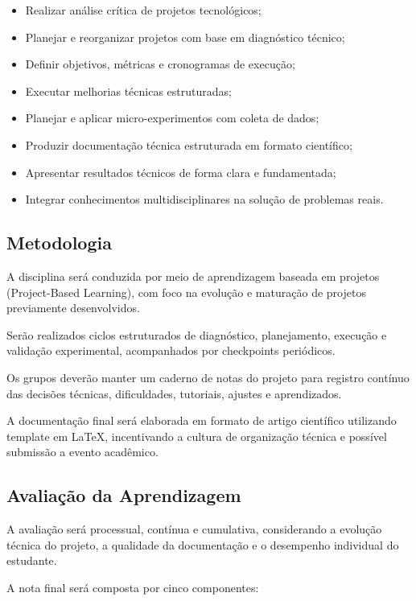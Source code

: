 \begin{itemize}
    \item Realizar análise crítica de projetos tecnológicos;
    \item Planejar e reorganizar projetos com base em diagnóstico técnico;
    \item Definir objetivos, métricas e cronogramas de execução;
    \item Executar melhorias técnicas estruturadas;
    \item Planejar e aplicar micro-experimentos com coleta de dados;
    \item Produzir documentação técnica estruturada em formato científico;
    \item Apresentar resultados técnicos de forma clara e fundamentada;
    \item Integrar conhecimentos multidisciplinares na solução de problemas reais.
\end{itemize}

\subsection*{Metodologia}

A disciplina será conduzida por meio de aprendizagem baseada em projetos (Project-Based Learning), com foco na evolução e maturação de projetos previamente desenvolvidos.

Serão realizados ciclos estruturados de diagnóstico, planejamento, execução e validação experimental, acompanhados por checkpoints periódicos.

Os grupos deverão manter um caderno de notas do projeto para registro contínuo das decisões técnicas, dificuldades, tutoriais, ajustes e aprendizados.

A documentação final será elaborada em formato de artigo científico utilizando template em \LaTeX{}, incentivando a cultura de organização técnica e possível submissão a evento acadêmico.

\subsection*{Avaliação da Aprendizagem}

A avaliação será processual, contínua e cumulativa, considerando a evolução técnica do projeto, a qualidade da documentação e o desempenho individual do estudante.

A nota final será composta por cinco componentes:

